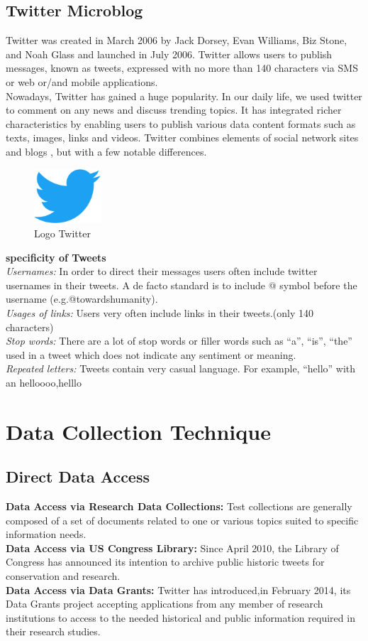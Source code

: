 \subsection{Twitter Microblog}
Twitter was created in March 2006 by Jack Dorsey, Evan Williams, Biz Stone, and Noah Glass and launched in July 2006. Twitter allows users  to publish messages, known as tweets, expressed with no more than 140 characters via SMS or web or/and mobile applications. 
\\Nowadays, Twitter has gained a huge popularity. In our daily life, we used twitter  to comment on any news and discuss trending topics. It has integrated richer characteristics by enabling users to publish various data content formats such as texts, images, links and videos.
Twitter combines elements of social network sites and blogs , but with a few notable differences.
\begin{figure} [H]
\begin{center}
\includegraphics [width=2.5cm]{tweet.png}
\caption{Logo Twitter}
\end{center}
\end{figure}
\vspace{-0.5cm}
\textbf{specificity of Tweets}
\\
\textit{Usernames:}
In order to direct their messages users often include twitter usernames in their tweets. A de facto standard is to include @ symbol before the username (e.g.@towardshumanity). 
\\
\textit{Usages of links:}
Users very often include links in their tweets.(only 140 characters)
\\
\textit{Stop words:}
There are a lot of stop words or filler words such as “a”, “is”, “the” used in a tweet which does not indicate any sentiment or meaning.
\\
\textit{Repeated letters:}
Tweets contain very casual language. For example,  “hello” with an 
helloooo,helllo 
\section{Data Collection Technique}
\subsection{Direct Data Access}
\textbf{Data Access via Research Data Collections:}
Test collections are generally composed of a set of documents related to one or various topics suited to specific information needs.\\
\textbf{Data Access via US Congress Library:}
Since April 2010, the Library of Congress has announced its intention to archive public historic tweets for conservation and research.\\
\textbf{Data Access via Data Grants:}
Twitter has introduced,in February 2014, its Data Grants project accepting applications from any member of research institutions to access to the needed historical and public information required in their research studies.
